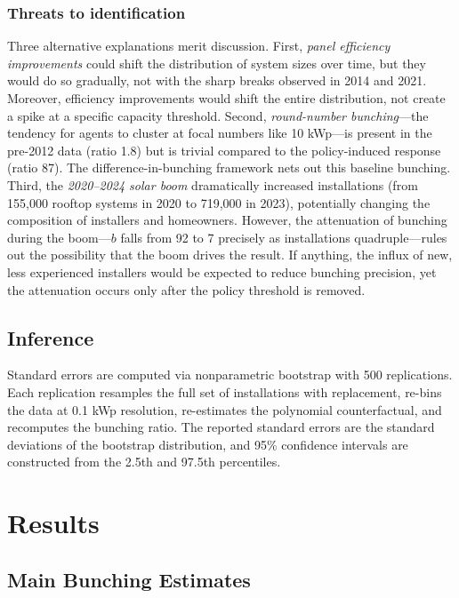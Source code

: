 \documentclass[12pt]{article}
\begin{document}
\subsubsection*{Threats to identification} Three alternative explanations merit discussion. First, \textit{panel efficiency improvements} could shift the distribution of system sizes over time, but they would do so gradually, not with the sharp breaks observed in 2014 and 2021. Moreover, efficiency improvements would shift the entire distribution, not create a spike at a specific capacity threshold. Second, \textit{round-number bunching}---the tendency for agents to cluster at focal numbers like 10 kWp---is present in the pre-2012 data (ratio 1.8) but is trivial compared to the policy-induced response (ratio 87). The difference-in-bunching framework nets out this baseline bunching. Third, the \textit{2020--2024 solar boom} dramatically increased installations (from 155,000 rooftop systems in 2020 to 719,000 in 2023), potentially changing the composition of installers and homeowners. However, the attenuation of bunching during the boom---$b$ falls from 92 to 7 precisely as installations quadruple---rules out the possibility that the boom drives the result. If anything, the influx of new, less experienced installers would be expected to reduce bunching precision, yet the attenuation occurs only after the policy threshold is removed.

\subsection{Inference}

Standard errors are computed via nonparametric bootstrap with 500 replications. Each replication resamples the full set of installations with replacement, re-bins the data at 0.1 kWp resolution, re-estimates the polynomial counterfactual, and recomputes the bunching ratio. The reported standard errors are the standard deviations of the bootstrap distribution, and 95\% confidence intervals are constructed from the 2.5th and 97.5th percentiles.


\section{Results}
\label{sec:results}

\subsection{Main Bunching Estimates}
\end{document}
